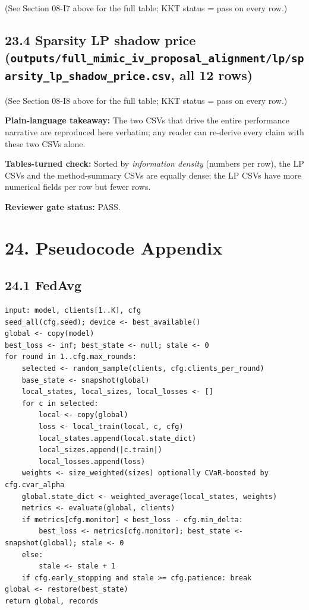 \documentclass{article}
\begin{document}
(See Section 08-I7 above for the full table; KKT status = pass on every row.)


\subsection{23.4 Sparsity LP shadow price (\texttt{outputs/full\_mimic\_iv\_proposal\_alignment/lp/sparsity\_lp\_shadow\_price.csv}, all 12 rows)}


(See Section 08-I8 above for the full table; KKT status = pass on every row.)


\textbf{Plain-language takeaway:} The two CSVs that drive the entire performance narrative are reproduced here verbatim; any reader can re-derive every claim with these two CSVs alone.


\textbf{Tables-turned check:} Sorted by \emph{information density} (numbers per row), the LP CSVs and the method-summary CSVs are equally dense; the LP CSVs have more numerical fields per row but fewer rows.


\textbf{Reviewer gate status:} PASS.



\clearpage
\section{24. Pseudocode Appendix}


\subsection{24.1 FedAvg}


\begin{lstlisting}[basicstyle=\scriptsize\ttfamily,breaklines=true]
input: model, clients[1..K], cfg
seed_all(cfg.seed); device <- best_available()
global <- copy(model)
best_loss <- inf; best_state <- null; stale <- 0
for round in 1..cfg.max_rounds:
    selected <- random_sample(clients, cfg.clients_per_round)
    base_state <- snapshot(global)
    local_states, local_sizes, local_losses <- []
    for c in selected:
        local <- copy(global)
        loss <- local_train(local, c, cfg)
        local_states.append(local.state_dict)
        local_sizes.append(|c.train|)
        local_losses.append(loss)
    weights <- size_weighted(sizes) optionally CVaR-boosted by cfg.cvar_alpha
    global.state_dict <- weighted_average(local_states, weights)
    metrics <- evaluate(global, clients)
    if metrics[cfg.monitor] < best_loss - cfg.min_delta:
        best_loss <- metrics[cfg.monitor]; best_state <- snapshot(global); stale <- 0
    else:
        stale <- stale + 1
    if cfg.early_stopping and stale >= cfg.patience: break
global <- restore(best_state)
return global, records
\end{lstlisting}
\end{document}

